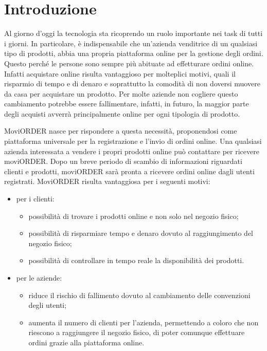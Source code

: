 
\chapter{Introduzione}
\label{cap:introduzione}

Al giorno d'oggi la tecnologia sta ricoprendo un ruolo importante nei task di tutti i giorni. In particolare, è indispensabile che un'azienda venditrice di un qualsiasi tipo di prodotti, abbia una propria piattaforma online per la gestione degli ordini. Questo perché le persone sono sempre più abituate ad effetturare ordini online. Infatti acquistare online risulta vantaggioso per molteplici motivi, quali il risparmio di tempo e di denaro e soprattutto la comodità di non doversi muovere da casa per acquistare un prodotto. Per molte aziende non cogliere questo cambiamento potrebbe essere fallimentare, infatti, in futuro, la maggior parte degli acquisti avverrà principalmente online per ogni tipologia di prodotto.

MoviORDER nasce per rispondere a questa necessità, proponendosi come piattaforma universale per la registrazione e l'invio di ordini online. Una qualsiasi azienda interessata a vendere i propri prodotti online può contattare \visione{} per ricevere moviORDER. Dopo un breve periodo di scambio di informazioni riguardati clienti e prodotti, moviORDER sarà pronta a ricevere ordini online dagli utenti registrati. 
MoviORDER risulta vantaggiosa per i seguenti motivi:
\begin{itemize}
	\item per i clienti:
	\begin{itemize}
		\item possibilità di trovare i prodotti online e non solo nel negozio fisico;
		\item possibilità di risparmiare tempo e denaro dovuto al raggiungimento del negozio fisico;
		\item possibilità di controllare in tempo reale la disponibilità dei prodotti.
	\end{itemize}
	\item per le aziende:
	\begin{itemize}
		\item riduce il rischio di fallimento dovuto al cambiamento delle convenzioni degli utenti;
		\item aumenta il numero di clienti per l'azienda, permettendo a coloro che non riescono a raggiungere il negozio fisico, di poter comunque effettuare ordini grazie alla piattaforma online.
	\end{itemize}
\end{itemize}

